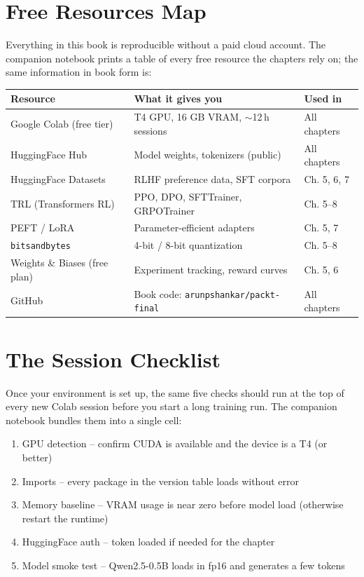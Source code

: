 \begin{chapterenv}
\section{Free Resources Map}

Everything in this book is reproducible without a paid cloud account. The companion notebook prints a table of every free resource the chapters rely on; the same information in book form is:

\begin{center}
\begin{tabular}{p{}p{}p{}}
\toprule
\textbf{Resource} & \textbf{What it gives you} & \textbf{Used in} \\
\midrule
Google Colab (free tier) & T4 GPU, 16 GB VRAM, $\sim$12\,h sessions & All chapters \\
HuggingFace Hub & Model weights, tokenizers (public) & All chapters \\
HuggingFace Datasets & RLHF preference data, SFT corpora & Ch. 5, 6, 7 \\
TRL (Transformers RL) & PPO, DPO, SFTTrainer, GRPOTrainer & Ch. 5--8 \\
PEFT / LoRA & Parameter-efficient adapters & Ch. 5, 7 \\
\texttt{bitsandbytes} & 4-bit / 8-bit quantization & Ch. 5--8 \\
Weights \& Biases (free plan) & Experiment tracking, reward curves & Ch. 5, 6 \\
GitHub & Book code: \texttt{arunpshankar/packt-final} & All chapters \\
\bottomrule
\end{tabular}
\end{center}

\section{The Session Checklist}

Once your environment is set up, the same five checks should run at the top of every new Colab session before you start a long training run. The companion notebook bundles them into a single cell:

\begin{enumerate}[nosep]
    \item GPU detection -- confirm CUDA is available and the device is a T4 (or better)
    \item Imports -- every package in the version table loads without error
    \item Memory baseline -- VRAM usage is near zero before model load (otherwise restart the runtime)
    \item HuggingFace auth -- token loaded if needed for the chapter
    \item Model smoke test -- Qwen2.5-0.5B loads in fp16 and generates a few tokens
\end{enumerate}


\end{chapterenv}
